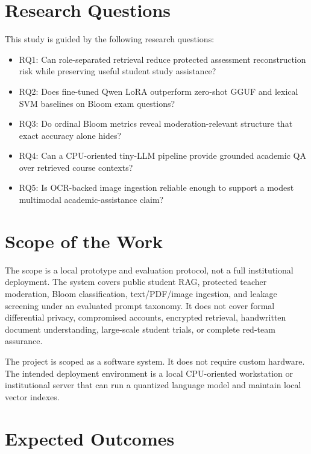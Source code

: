 \section{Research Questions}

This study is guided by the following research questions:
\begin{itemize}
    \item RQ1: Can role-separated retrieval reduce protected assessment reconstruction risk while preserving useful student study assistance?
    \item RQ2: Does fine-tuned Qwen LoRA outperform zero-shot GGUF and lexical SVM baselines on Bloom exam questions?
    \item RQ3: Do ordinal Bloom metrics reveal moderation-relevant structure that exact accuracy alone hides?
    \item RQ4: Can a CPU-oriented tiny-LLM pipeline provide grounded academic QA over retrieved course contexts?
    \item RQ5: Is OCR-backed image ingestion reliable enough to support a modest multimodal academic-assistance claim?
\end{itemize}

\section{Scope of the Work}

The scope is a local prototype and evaluation protocol, not a full institutional deployment. The system covers public student RAG, protected teacher moderation, Bloom classification, text/PDF/image ingestion, and leakage screening under an evaluated prompt taxonomy. It does not cover formal differential privacy, compromised accounts, encrypted retrieval, handwritten document understanding, large-scale student trials, or complete red-team assurance.

The project is scoped as a software system. It does not require custom hardware. The intended deployment environment is a local CPU-oriented workstation or institutional server that can run a quantized language model and maintain local vector indexes.

\section{Expected Outcomes}

